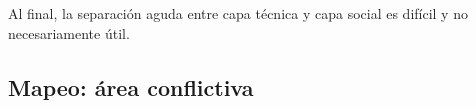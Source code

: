 Al final, la separación aguda entre capa técnica y capa social es difícil y no necesariamente útil.

\begin{comment}

[FiTre2015]
"we show how the current revival of grassroots community networks can counterbalance the erosion of autonomy of Internet users that results from current
telecom policies."

---
[Rieder2012]

> framing the Internet alternately as lawless, anarchic,
> free, “a world where anyone, anywhere may express his or her beliefs, no matter how singular,
> without fear of being coerced into silence or conformity” (Barlow 1996) (p.1)

* la infraestructura está prerequisito para participación

## Conclusión del texto [Rieder2012]

> If technology won’t deliver us from the conundrums of
> governance, negotiation, and struggle, we
> may as well reengage politics proper[ly].

* sobre todo problemas sociales/políticos: organización de grupos (no tanto técnicos): ¿cómo decidimos como grupo? ¿quién hace qué? ¿quién está responsable?
* soluciones políticas para problemas políticos
\end{comment}

\subsection{Mapeo: área conflictiva}

